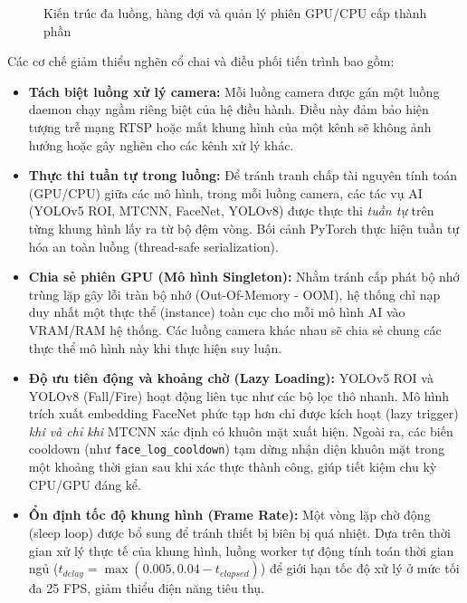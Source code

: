 \documentclass[12pt,a4paper]{article}
\begin{document}
\begin{figure}[htbp]
{%
    }
    \caption{Kiến trúc đa luồng, hàng đợi và quản lý phiên GPU/CPU cấp thành phần}
    \label{fig:component_architecture}
\end{figure}

Các cơ chế giảm thiểu nghẽn cổ chai và điều phối tiến trình bao gồm:
\begin{itemize}
    \item \textbf{Tách biệt luồng xử lý camera:} Mỗi luồng camera được gán một luồng daemon chạy ngầm riêng biệt của hệ điều hành. Điều này đảm bảo hiện tượng trễ mạng RTSP hoặc mất khung hình của một kênh sẽ không ảnh hưởng hoặc gây nghẽn cho các kênh xử lý khác.
    \item \textbf{Thực thi tuần tự trong luồng:} Để tránh tranh chấp tài nguyên tính toán (GPU/CPU) giữa các mô hình, trong mỗi luồng camera, các tác vụ AI (YOLOv5 ROI, MTCNN, FaceNet, YOLOv8) được thực thi \textit{tuần tự} trên từng khung hình lấy ra từ bộ đệm vòng. Bối cảnh PyTorch thực hiện tuần tự hóa an toàn luồng (thread-safe serialization).
    \item \textbf{Chia sẻ phiên GPU (Mô hình Singleton):} Nhằm tránh cấp phát bộ nhớ trùng lặp gây lỗi tràn bộ nhớ (Out-Of-Memory - OOM), hệ thống chỉ nạp duy nhất một thực thể (instance) toàn cục cho mỗi mô hình AI vào VRAM/RAM hệ thống. Các luồng camera khác nhau sẽ chia sẻ chung các thực thể mô hình này khi thực hiện suy luận.
    \item \textbf{Độ ưu tiên động và khoảng chờ (Lazy Loading):} YOLOv5 ROI và YOLOv8 (Fall/Fire) hoạt động liên tục như các bộ lọc thô nhanh. Mô hình trích xuất embedding FaceNet phức tạp hơn chỉ được kích hoạt (lazy trigger) \textit{khi và chỉ khi} MTCNN xác định có khuôn mặt xuất hiện. Ngoài ra, các biến cooldown (như \texttt{face\_log\_cooldown}) tạm dừng nhận diện khuôn mặt trong một khoảng thời gian sau khi xác thực thành công, giúp tiết kiệm chu kỳ CPU/GPU đáng kể.
    \item \textbf{Ổn định tốc độ khung hình (Frame Rate):} Một vòng lặp chờ động (sleep loop) được bổ sung để tránh thiết bị biên bị quá nhiệt. Dựa trên thời gian xử lý thực tế của khung hình, luồng worker tự động tính toán thời gian ngủ ($t_{delay} = \max(0.005, 0.04 - t_{elapsed})$) để giới hạn tốc độ xử lý ở mức tối đa 25 FPS, giảm thiểu điện năng tiêu thụ.
\end{itemize}
\end{document}
